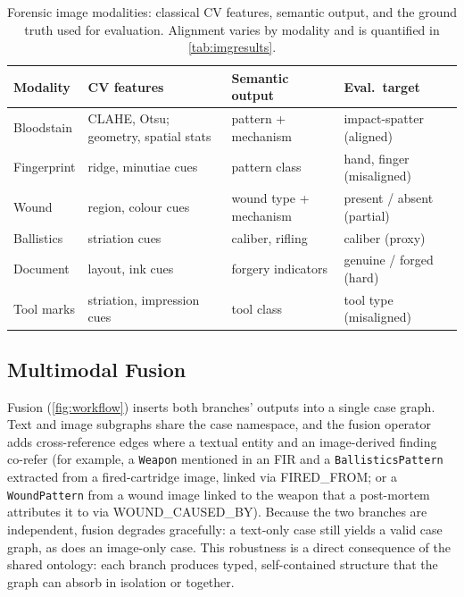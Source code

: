 \documentclass[conference]{IEEEtran}
\newcommand{\rel}[1]{\textup{\MakeUppercase{#1}}}
\newcommand{\node}[1]{\texttt{#1}}
\begin{document}
\begin{table}[t]
  \centering
  \caption{Forensic image modalities: classical CV features, semantic output,
  and the ground truth used for evaluation. Alignment varies by modality and is
  quantified in \cref{tab:imgresults}.}
  \label{tab:imgmod}
  \scriptsize
  \setlength{\tabcolsep}{3.5pt}
  \begin{tabular}{@{}P{1.3cm}P{2.45cm}P{1.7cm}P{1.85cm}@{}}
    \toprule
    \textbf{Modality} & \textbf{CV features} & \textbf{Semantic output} & \textbf{Eval.\ target} \\
    \midrule
    Bloodstain & CLAHE, Otsu; geometry, spatial stats & pattern + mechanism & impact-spatter (aligned) \\
    Fingerprint & ridge, minutiae cues & pattern class & hand, finger (misaligned) \\
    Wound & region, colour cues & wound type + mechanism & present / absent (partial) \\
    Ballistics & striation cues & caliber, rifling & caliber (proxy) \\
    Document & layout, ink cues & forgery indicators & genuine / forged (hard) \\
    Tool marks & striation, impression cues & tool class & tool type (misaligned) \\
    \bottomrule
  \end{tabular}
\end{table}

\subsection{Multimodal Fusion}
\label{sec:fusion}

Fusion (\cref{fig:workflow}) inserts both branches' outputs into a single case
graph. Text and image subgraphs share the case namespace, and the fusion operator
adds cross-reference edges where a textual entity and an image-derived finding
co-refer (for example, a \node{Weapon} mentioned in an FIR and a
\node{BallisticsPattern} extracted from a fired-cartridge image, linked via
\rel{fired\_from}; or a \node{WoundPattern} from a wound image linked to the
weapon that a post-mortem attributes it to via \rel{wound\_caused\_by}). Because
the two branches are independent, fusion degrades gracefully: a text-only case
still yields a valid case graph, as does an image-only case. This robustness is a
direct consequence of the shared ontology: each branch produces typed,
self-contained structure that the graph can absorb in isolation or together.
\end{document}
